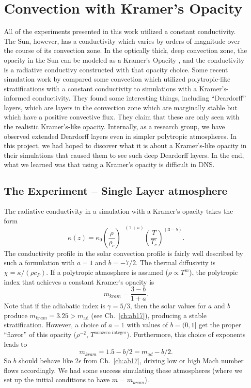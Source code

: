 \section{Convection with Kramer's Opacity}
All of the experiments presented in this work utilized a constant conductivity.
The Sun, however, has a conductivity which varies by orders of magnitude over the course of its convection zone.
In the optically thick, deep convection zone, the opacity in the Sun can be modeled as a Kramer's Opacity \citep[see e.g.,][]{brandenburg2016}, and the conductivity is a radiative conductivy constructed with that opacity choice.
Some recent simulation work by \citet{kapyla&all2017} compared some convection which utilized polytropic-like stratifications with a constant conductivity to simulations with a Kramer's-informed conductivity.
They found some interesting things, including ``Deardorff'' layers, which are layers in the convection zone which are marginally stable but which have a positive convective flux.
They claim that these are only seen with the realistic Kramer's-like opacity.
Internally, as a research group, we have observed extended Deardorff layers even in simpler polytropic atmospheres.
In this project, we had hoped to discover what it is about a Kramer's-like opacity in their simulations that caused them to see such deep Deardorff layers.
In the end, what we learned was that using a Kramer's opacity is difficult in DNS.

\subsection{The Experiment -- Single Layer atmosphere}
The radiative conductivity in a simulation with a Kramer's opacity \citep{kapyla&all2017} takes the form
$$
\kappa(z) = \kappa_0 \left(\frac{\rho}{\rho_c}\right)^{-(1+a)} \left(\frac{T}{T_c}\right)^{(3-b)}.
$$
The conductivity profile in the solar convection profile is fairly well described by such a formulation with $a = 1$ and $b = -7/2$.
The thermal diffusivity is $\chi = \kappa / (\rho c_P)$. 
If a polytropic atmosphere is assumed ($\rho \propto T^m$), the polytropic index that achieves a constant Kramer's opacity \citep{jones1976} is
$$
m_{kram} = \frac{3 - b}{1 + a}.
$$
Note that if the adiabatic index is $\gamma = 5/3$, then the solar values for $a$ and $b$ produce $m_{kram} = 3.25 > m_{\text{ad}}$ (see Ch.~\ref{ch:ab17}), producing a stable stratification.
However, a choice of $a = 1$ with values of $b = (0, 1]$ get the proper ``flavor'' of this opacity ($\rho^{-2}$, $T^{\text{nonzero integer}}$).
Furthermore, this choice of exponents leads to
\begin{equation}
m_{kram} = 1.5 - b/2 = m_{ad} - b/2.
\end{equation}
So $b$ should behave like $2\epsilon$ from Ch.~\ref{ch:ab17}, driving low or high Mach number flows accordingly.
We had some success simulating these atmospheres (where we set up the initial conditions to have $m = m_{kram}$).

